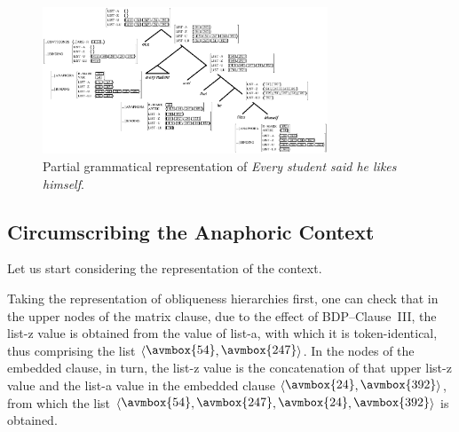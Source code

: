 \documentclass[output=paper
,modfonts
,nonflat]{langsci/langscibook}
\begin{document}
\begin{figure}
\begin{center}
\includegraphics[angle=90,width=8.5cm]{figures/brancotree.eps}
\caption{Partial grammatical representation of \emph{Every student said he likes
himself}.}
\end{center}
\end{figure}




\subsection{Circumscribing the Anaphoric Context}

Let us start considering the representation of the context.

Taking
the representation of obliqueness hierarchies first, one can check that 
in the upper nodes of the  matrix clause, due to the effect of BDP--Clause~III, 
the {\sc list-z} value is obtained from the value of {\sc list-a},  with which it is
token-identical, thus comprising the list 
$\langle\raisebox{.25ex}{\avmbox{54}},\raisebox{.25ex}{\avmbox{247}}\rangle$.
In the nodes of the embedded clause, in turn, the {\sc list-z} value is the concatenation 
of that upper {\sc list-z} value and the {\sc list-a} value in the embedded clause
$\langle\raisebox{.25ex}{\avmbox{24}},\raisebox{.25ex}{\avmbox{392}}\rangle$,
from which the list 
$\langle\raisebox{.25ex}{\avmbox{54}},\raisebox{.25ex}{\avmbox{247}},\raisebox{.25ex}{\avmbox{24}},\raisebox{.25ex}{\avmbox{392}}\rangle$
is obtained. 
\end{document}
